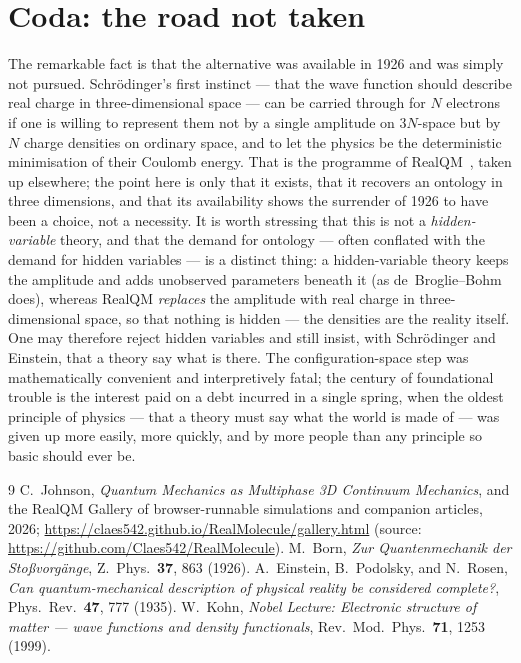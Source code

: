 \documentclass[11pt]{article}
\begin{document}
\section{Coda: the road not taken}

The remarkable fact is that the alternative was available in 1926 and was simply not pursued. Schr\"odinger's
first instinct --- that the wave function should describe real charge in three-dimensional space --- can be
carried through for $N$ electrons if one is willing to represent them not by a single amplitude on $3N$-space but
by $N$ charge densities on ordinary space, and to let the physics be the deterministic minimisation of their
Coulomb energy. That is the programme of RealQM~\cite{RealQM}, taken up elsewhere; the point here is only that it exists, that
it recovers an ontology in three dimensions, and that its availability shows the surrender of 1926 to have been a
choice, not a necessity. It is worth stressing that this is not a \emph{hidden-variable} theory, and that the
demand for ontology --- often conflated with the demand for hidden variables --- is a distinct thing: a
hidden-variable theory keeps the amplitude and adds unobserved parameters beneath it (as de~Broglie--Bohm does),
whereas RealQM \emph{replaces} the amplitude with real charge in three-dimensional space, so that nothing is
hidden --- the densities are the reality itself. One may therefore reject hidden variables and still insist, with
Schr\"odinger and Einstein, that a theory say what is there. The configuration-space step was mathematically convenient and interpretively fatal;
the century of foundational trouble is the interest paid on a debt incurred in a single spring, when the oldest
principle of physics --- that a theory must say what the world is made of --- was given up more easily, more
quickly, and by more people than any principle so basic should ever be.

\begin{thebibliography}{9}
 C.~Johnson, \emph{Quantum Mechanics as Multiphase 3D Continuum Mechanics}, and the RealQM
Gallery of browser-runnable simulations and companion articles, 2026;
\url{https://claes542.github.io/RealMolecule/gallery.html} (source: \url{https://github.com/Claes542/RealMolecule}).
 M.~Born, \emph{Zur Quantenmechanik der Sto\ss vorg\"ange}, Z.\ Phys.\ \textbf{37}, 863 (1926).
 A.~Einstein, B.~Podolsky, and N.~Rosen, \emph{Can quantum-mechanical description of physical
reality be considered complete?}, Phys.\ Rev.\ \textbf{47}, 777 (1935).
 W.~Kohn, \emph{Nobel Lecture: Electronic structure of matter --- wave functions and density
functionals}, Rev.\ Mod.\ Phys.\ \textbf{71}, 1253 (1999).
\end{thebibliography}
\end{document}
